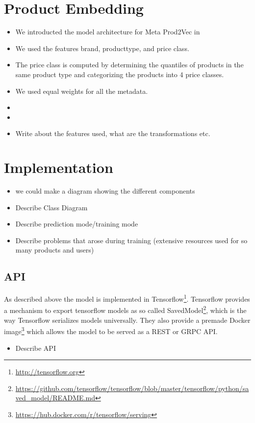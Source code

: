 \section{Product Embedding}
\begin{itemize}
    \item We introducted the model architecture for Meta Prod2Vec in~
    \item We used the features brand, producttype, and price class.
    \item The price class is computed by determining the quantiles of products in the same product type and categorizing the products into 4 price classes.
    \item We used equal weights for all the metadata.
    \item 
    \item 
    \item Write about the features used, what are the transformations etc.
\end{itemize}

\section{Implementation}

\begin{itemize}
    \item we could make a diagram showing the different components
\item Describe Class Diagram
\item Describe prediction mode/training mode
\item Describe problems that arose during training (extensive resources used for so many products and users)
\end{itemize}
\subsection{API}\label{sec:api}
As described above the model is implemented in Tensorflow\footnote{\url{http://tensorflow.org}}.
Tensorflow provides a mechanism to export tensorflow models as so called SavedModel\footnote{\url{https://github.com/tensorflow/tensorflow/blob/master/tensorflow/python/saved_model/README.md}}, which is the way Tensorflow serializes models universally.
They also provide a premade Docker image\footnote{\url{https://hub.docker.com/r/tensorflow/serving}} which allows the model to be served as a REST or GRPC API.
\begin{itemize}
\item Describe API
\end{itemize}


